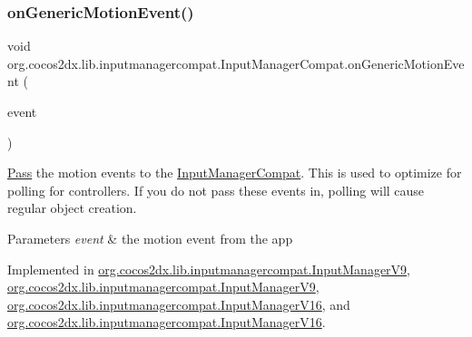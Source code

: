 \subsubsection{\texorpdfstring{on\+Generic\+Motion\+Event()}{onGenericMotionEvent()}\hspace{0.1cm}{\footnotesize\ttfamily [1/2]}}
{\footnotesize\ttfamily void org.\+cocos2dx.\+lib.\+inputmanagercompat.\+Input\+Manager\+Compat.\+on\+Generic\+Motion\+Event (\begin{DoxyParamCaption}\item[{Motion\+Event}]{event }\end{DoxyParamCaption})}

\hyperlink{classPass}{Pass} the motion events to the \hyperlink{interfaceorg_1_1cocos2dx_1_1lib_1_1inputmanagercompat_1_1InputManagerCompat}{Input\+Manager\+Compat}. This is used to optimize for polling for controllers. If you do not pass these events in, polling will cause regular object creation.


\begin{DoxyParams}{Parameters}
{\em event} & the motion event from the app \\
\hline
\end{DoxyParams}


Implemented in \hyperlink{classorg_1_1cocos2dx_1_1lib_1_1inputmanagercompat_1_1InputManagerV9_aa7e7451896e351e520f511388907fde9}{org.\+cocos2dx.\+lib.\+inputmanagercompat.\+Input\+Manager\+V9}, \hyperlink{classorg_1_1cocos2dx_1_1lib_1_1inputmanagercompat_1_1InputManagerV9_aa7e7451896e351e520f511388907fde9}{org.\+cocos2dx.\+lib.\+inputmanagercompat.\+Input\+Manager\+V9}, \hyperlink{classorg_1_1cocos2dx_1_1lib_1_1inputmanagercompat_1_1InputManagerV16_ab72ef0c7bf1fcc4cbd2f609d2e47f745}{org.\+cocos2dx.\+lib.\+inputmanagercompat.\+Input\+Manager\+V16}, and \hyperlink{classorg_1_1cocos2dx_1_1lib_1_1inputmanagercompat_1_1InputManagerV16_ab72ef0c7bf1fcc4cbd2f609d2e47f745}{org.\+cocos2dx.\+lib.\+inputmanagercompat.\+Input\+Manager\+V16}.

\mbox{\label{interfaceorg_1_1cocos2dx_1_1lib_1_1inputmanagercompat_1_1InputManagerCompat_a813a0308659d716c9503d44ccb48ebb1}} 
